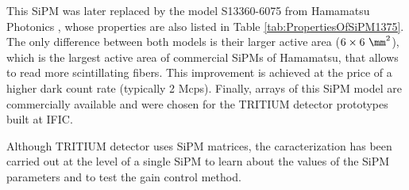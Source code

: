 This SiPM was later replaced by the model S13360-6075 from Hamamatsu Photonics \cite{DataSheetHammamatsu_1_SiPM_75}, whose properties are also listed in Table \ref{tab:PropertiesOfSiPM1375}. The only difference between both models is their larger active area ($6\times6~\mm^2$), which is the largest active area of commercial SiPMs of Hamamatsu, that allows to read more scintillating fibers. This improvement is achieved at the price of a higher dark count rate (typically 2 Mcps). Finally, arrays of this SiPM model are commercially available and were chosen for the TRITIUM detector prototypes built at IFIC.

Although TRITIUM detector uses SiPM matrices, the caracterization has been carried out at the level of a single SiPM to learn about the values of the SiPM parameters and to test the gain control method. %